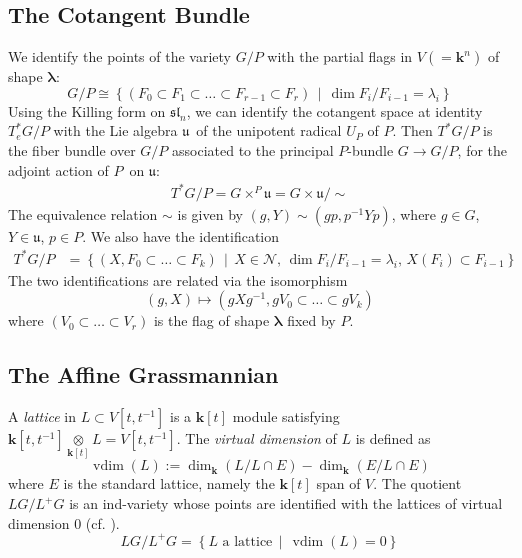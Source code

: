 \documentclass[paper=a4, fontsize=10pt]{amsart} %
\theoremstyle{plain}
\theoremstyle{definition}
\theoremstyle{remark}
\numberwithin{equation}{section} %
\numberwithin{figure}{section} %
\numberwithin{table}{section} %
\numberwithin{subsection}{section} %
\def\tensor{\mathop{\otimes}}
\def\mid{\,\middle\vert\,}
\def\gl{\ensuremath{G}}
\def\gL{\ensuremath{L\gl}}
\def\gLhat{\gL}
\def\gOhat{\ensuremath{L^+\gl}}
\def\para{\ensuremath{P}}
\def\u{\ensuremath{\mathfrak u}}
\def\Y{\ensuremath{Y}}
\def\Ni{\ensuremath{\mathcal N}}
\begin{document}
\subsection{The Cotangent Bundle}
\label{defCotan}
We identify the points of the variety $G/P$ with the partial flags in $V(=\mathbf k^n)$ of shape $\boldsymbol\lambda$:
$$G/P\cong\left\{(F_0\subset F_1\subset\ldots\subset F_{r-1}\subset F_r)\mid\dim F_i/F_{i-1}=\lambda_i\right\}$$
Using the Killing form on $\mathfrak{sl}_n$, we can identify the cotangent space at identity $T^*_eG/P$ with the Lie algebra \u\ of the unipotent radical $U_P$ of \para.
Then $T^*\gl/\para$ is the fiber bundle over $\gl/\para$ associated to the principal \para-bundle $\gl\rightarrow\gl/\para$, for the adjoint action of \para\ on \u:\begin{align*}
    T^*\gl/\para=\gl\times^\para\u=\gl\times\u/\sim
\end{align*}
The equivalence relation $\sim$ is given by $(g,\Y)\sim(gp,p^{-1}\Y p)$, where $g\in\gl$, $\Y\in\u$, $p\in\para$.
\def\cot{\ensuremath{\widetilde\Ni_{\boldsymbol\lambda}}}
We also have the identification\begin{align}\label{defcotan2}
    T^*G/P  &=\left\{(X,F_0\subset\ldots\subset F_k)\mid X\in\Ni,\,\dim F_i/F_{i-1}=\lambda_i,\,X(F_i)\subset F_{i-1}\right\}
\end{align}
The two identifications are related via the isomorphism 
$$(g,X)\mapsto (gXg^{-1},gV_0\subset\ldots\subset gV_k)$$
where $(V_0\subset\ldots\subset V_r)$ is the flag of shape $\boldsymbol\lambda$ fixed by $P$.

\subsection{The Affine Grassmannian}
\label{vdim}
A \emph{lattice} in $L\subset V[t,t^{-1}]$ is a $\mathbf k[t]$ module satisfying $\mathbf k[t,t^{-1}]\tensor\limits_{\mathbf k[t]} L=V[t,t^{-1}]$.
The \emph{virtual dimension} of $L$ is defined as \vskip -4pt
$$\operatorname{vdim}(L):=\dim_{\mathbf k}(L/L\cap E)-\dim_{\mathbf k}(E/L\cap E)$$
where $E$ is the standard lattice, namely the $\mathbf k[t]$ span of $V$. 
The quotient $\gLhat/\gOhat$ is an ind-variety whose points are identified with the lattices of virtual dimension $0$ (cf. \cite{gf}).
$$\gLhat/\gOhat=\left\{L\text{ a lattice}\mid \operatorname{vdim}(L)=0\right\}$$ 
\end{document}

